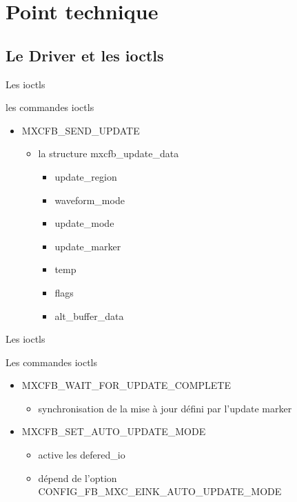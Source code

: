 \section{Point technique}


\subsection{Le Driver et les ioctls}
\begin{frame}[fragile]{Les ioctls}
	\begin{block}{les commandes ioctls}
		\begin{itemize}
			\item MXCFB\_SEND\_UPDATE 
				\begin{itemize}
					\item la structure mxcfb\_update\_data 
							\begin{itemize}
								\item update\_region
								\item waveform\_mode
								\item update\_mode
								\item update\_marker
								\item temp
								\item flags
								\item alt\_buffer\_data
							\end{itemize}
				\end{itemize}
		\end{itemize}
	\end{block}
\end{frame}

\begin{frame}{Les ioctls}
	\begin{block} { Les commandes ioctls}
		\begin{itemize}
				\item MXCFB\_WAIT\_FOR\_UPDATE\_COMPLETE
			\begin{itemize}
				\item synchronisation de la mise à jour défini par l'update marker
			\end{itemize}
			\item MXCFB\_SET\_AUTO\_UPDATE\_MODE
			\begin{itemize}
				\item active les defered\_io
				\item dépend de l'option CONFIG\_FB\_MXC\_EINK\_AUTO\_UPDATE\_MODE
			\end{itemize}
		\end{itemize}
	\end{block}
\end{frame}

